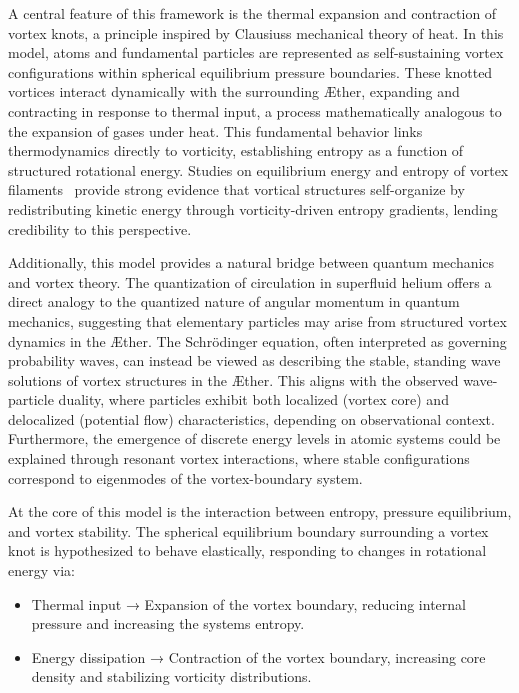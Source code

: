 A central feature of this framework is the thermal expansion and contraction of vortex knots, a principle inspired by Clausius\rqs s mechanical theory of heat. In this model, atoms and fundamental particles are represented as self-sustaining vortex configurations within spherical equilibrium pressure boundaries. These knotted vortices interact dynamically with the surrounding Æther, expanding and contracting in response to thermal input, a process mathematically analogous to the expansion of gases under heat. This fundamental behavior links thermodynamics directly to vorticity, establishing entropy as a function of structured rotational energy. Studies on equilibrium energy and entropy of vortex filaments~\cite{belik2023} provide strong evidence that vortical structures self-organize by redistributing kinetic energy through vorticity-driven entropy gradients, lending credibility to this perspective.

Additionally, this model provides a natural bridge between quantum mechanics and vortex theory. The quantization of circulation in superfluid helium offers a direct analogy to the quantized nature of angular momentum in quantum mechanics, suggesting that elementary particles may arise from structured vortex dynamics in the Æther. The Schrödinger equation, often interpreted as governing probability waves, can instead be viewed as describing the stable, standing wave solutions of vortex structures in the Æther. This aligns with the observed wave-particle duality, where particles exhibit both localized (vortex core) and delocalized (potential flow) characteristics, depending on observational context. Furthermore, the emergence of discrete energy levels in atomic systems could be explained through resonant vortex interactions, where stable configurations correspond to eigenmodes of the vortex-boundary system.

At the core of this model is the interaction between entropy, pressure equilibrium, and vortex stability. The spherical equilibrium boundary surrounding a vortex knot is hypothesized to behave elastically, responding to changes in rotational energy via:

\begin{itemize}
    \item Thermal input → Expansion of the vortex boundary, reducing internal pressure and increasing the system\rqs s entropy.
    \item Energy dissipation → Contraction of the vortex boundary, increasing core density and stabilizing vorticity distributions.
\end{itemize}

